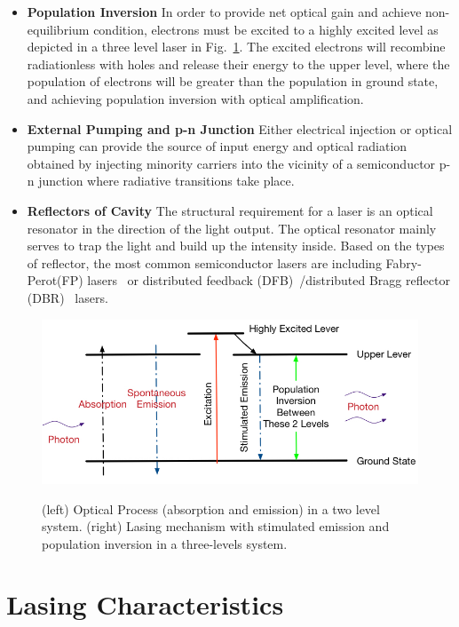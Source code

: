\begin{itemize}
  \item \textbf{Population Inversion} In order to provide net optical gain and achieve non-equilibrium condition, electrons must be excited to a highly excited level as depicted in a three level laser in Fig.~\ref{Threelevel}. The excited electrons will recombine radiationless with holes and release their energy to the upper level, where the population of electrons will be greater than the population in ground state, and achieving population inversion with optical amplification.
  \item \textbf{External Pumping and p-n Junction} Either electrical injection or optical pumping can provide the source of input energy and optical radiation obtained by injecting minority carriers into the vicinity of a semiconductor p-n junction where radiative transitions take place.
  \item \textbf{Reflectors of Cavity} The structural requirement for a laser is an optical resonator in the direction of the light output. The optical resonator mainly serves to trap the light and build up the intensity inside. Based on the types of reflector, the most common semiconductor lasers are including Fabry-Perot(FP) lasers~\cite{Duan:2003en} or distributed feedback (DFB)~\cite{wang2015room}/distributed Bragg reflector (DBR)~\cite{chen2006nanowire} lasers.
\end{itemize}

\begin{figure}
  \caption{(left) Optical Process (absorption and emission) in a two level system. (right) Lasing mechanism with stimulated emission and population inversion in a three-levels system.}
  \centering
  \includegraphics[width=\textwidth]{pictures/LT/Threelevel}
  \label{Threelevel}
\end{figure}

\section{Lasing Characteristics}

